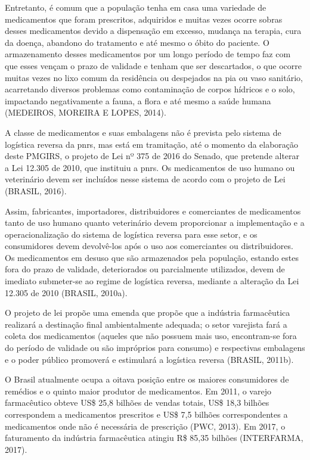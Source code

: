 \begin{description}
	Entretanto, é comum que a população tenha em casa uma variedade de medicamentos que foram prescritos, adquiridos e muitas vezes ocorre sobras desses medicamentos devido a dispensação em excesso, mudança na terapia, cura da doença, abandono do tratamento e até mesmo o óbito do paciente. O armazenamento desses medicamentos por um longo período de tempo faz com que esses vençam o prazo de validade e tenham que ser descartados, o que ocorre muitas vezes no lixo comum da residência ou despejados na pia ou vaso sanitário, acarretando diversos problemas como contaminação de corpos hídricos e o solo, impactando negativamente a fauna, a flora e até mesmo a saúde humana (MEDEIROS, MOREIRA E LOPES, 2014).
	
	A classe de medicamentos e suas embalagens não é prevista pelo sistema de logística reversa da \gls{pnrs}, mas está em tramitação, até o momento da elaboração deste PMGIRS, o projeto de Lei nº 375 de 2016 do Senado, que pretende alterar a Lei 12.305 de 2010, que instituiu a \gls{pnrs}. Os medicamentos de uso humano ou veterinário devem ser incluídos nesse sistema de acordo com o projeto de Lei (BRASIL, 2016).
	
	Assim, fabricantes, importadores, distribuidores e comerciantes de medicamentos tanto de uso humano quanto veterinário devem proporcionar a implementação e a operacionalização do sistema de logística reversa para esse setor, e os consumidores devem devolvê-los após o uso aos comerciantes ou distribuidores. Os medicamentos em desuso que são armazenados pela população, estando estes fora do prazo de validade, deteriorados ou parcialmente utilizados, devem de imediato submeter-se ao regime de logística reversa, mediante a alteração da Lei 12.305 de 2010 (BRASIL, 2010a).
	
	O projeto de lei propõe uma emenda que propõe que a indústria farmacêutica realizará a destinação final ambientalmente adequada; o setor varejista fará a coleta dos medicamentos (aqueles que não possuem mais uso, encontram-se fora do período de validade ou são impróprios para consumo) e respectivas embalagens e o poder público promoverá e estimulará a logística reversa (BRASIL, 2011b).

	O Brasil atualmente ocupa a oitava posição entre os maiores consumidores de remédios e o quinto maior produtor de medicamentos. Em 2011, o varejo farmacêutico obteve US\$ 25,8 bilhões de vendas totais, US\$ 18,3 bilhões correspondem a medicamentos prescritos e US\$ 7,5 bilhões correspondentes a medicamentos onde não é necessária de prescrição (PWC, 2013). Em 2017, o faturamento da indústria farmacêutica atingiu R\$ 85,35 bilhões (INTERFARMA, 2017).
	 

\end{description}
